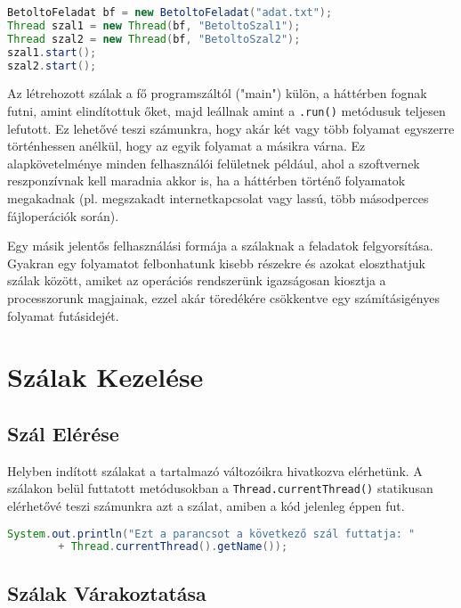 \documentclass{article}
\let\l\lstinline
\begin{document}
\begin{lstlisting}[language=Java, caption=Új szálak indítása ugyanazzal a Runnable obkaketummal]
BetoltoFeladat bf = new BetoltoFeladat("adat.txt");
Thread szal1 = new Thread(bf, "BetoltoSzal1");
Thread szal2 = new Thread(bf, "BetoltoSzal2");
szal1.start();
szal2.start();
\end{lstlisting}

	\newpage

Az létrehozott szálak a fő programszáltól ("main") külön, a háttérben fognak futni, amint elindítottuk őket, majd leállnak amint a \l{.run()} metódusuk teljesen lefutott. Ez lehetővé teszi számunkra, hogy akár két vagy több folyamat egyszerre történhessen anélkül, hogy az egyik folyamat a másikra várna. Ez alapkövetelménye minden felhasználói felületnek például, ahol a szoftvernek reszponzívnak kell maradnia akkor is, ha a háttérben történő folyamatok megakadnak (pl. megszakadt internetkapcsolat vagy lassú, több másodperces fájloperációk során).

Egy másik jelentős felhasználási formája a szálaknak a feladatok felgyorsítása. Gyakran egy folyamatot felbonhatunk kisebb részekre és azokat eloszthatjuk szálak között, amiket az operációs rendszerünk igazságosan kiosztja a processzorunk magjainak, ezzel akár töredékére csökkentve egy számításigényes folyamat futásidejét.

	\section{Szálak Kezelése}

	\subsection{Szál Elérése}
Helyben indított szálakat a tartalmazó változóikra hivatkozva elérhetünk. A szálakon belül futtatott metódusokban a \l{Thread.currentThread()} statikusan elérhetővé teszi számunkra azt a szálat, amiben a kód jelenleg éppen fut.

\begin{lstlisting}[language=Java, caption=Jelenlegi szál nevének kiírása]
System.out.println("Ezt a parancsot a következő szál futtatja: "
		+ Thread.currentThread().getName());
\end{lstlisting}

	\newpage

	\subsection{Szálak Várakoztatása}
\end{document}
